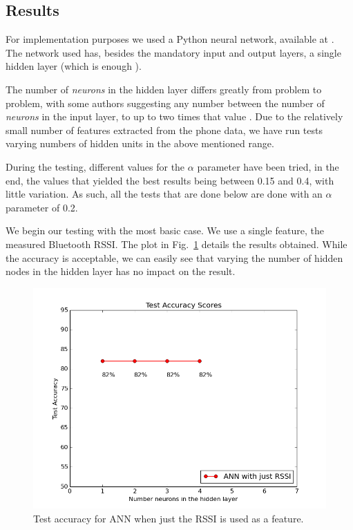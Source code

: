 \subsection{Results}

For implementation purposes we used a Python neural network, available at \cite{issam}. The network used has, besides the mandatory input and output layers, a single hidden layer (which is enough \cite{Hornik1989359,Hartman,cybenko}). 

The number of \textit{neurons} in the hidden layer differs greatly from problem to problem, with some authors suggesting any number between the number of \textit{neurons} in the input layer, to up to two times that value \cite{Stathakis}. Due to the relatively small number of features extracted from the phone data, we have run tests varying numbers of hidden units in the above mentioned range. 

During the testing, different values for the $\alpha$ parameter have been tried, in the end, the values that yielded the best results being between 0.15 and 0.4, with little variation. As such, all the tests that are done below are done with an $\alpha$ parameter of 0.2. 

We begin our testing with the most basic case. We use a single feature, the measured Bluetooth RSSI. The plot in Fig.~\ref{pic:ann_single} details the results obtained. While the accuracy is acceptable, we can easily see that varying the number of hidden nodes in the hidden layer has no impact on the result. 

\begin{figure}[h]
	\begin{center}
		\includegraphics[scale=0.6]{figures/ann_simple.png}
	\end{center}
	
	\caption{Test accuracy for ANN when just the RSSI is used as a feature.}
	\label{pic:ann_single}

\end{figure}

